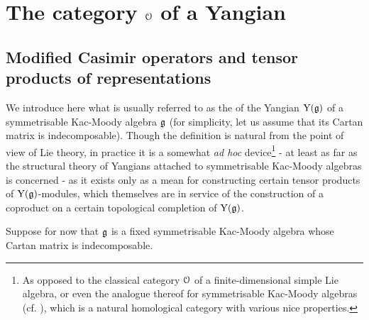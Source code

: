 \section{The category \texorpdfstring{$\mathcal{O}$}{} of a Yangian}
    \subsection{Modified Casimir operators and tensor products of representations}
        We introduce here what is usually referred to as the  of the Yangian $\mathrm{Y}(\mathfrak{g})$ of a symmetrisable Kac-Moody algebra $\mathfrak{g}$ (for simplicity, let us assume that its Cartan matrix is indecomposable). Though the definition is natural from the point of view of Lie theory, in practice it is a somewhat \textit{ad hoc} device\footnote{As opposed to the classical category $\mathcal{O}$ of a finite-dimensional simple Lie algebra, or even the analogue thereof for symmetrisable Kac-Moody algebras (cf. \cite[Chapter 9]{kac_infinite_dimensional_lie_algebras}), which is a natural homological category with various nice properties.} - at least as far as the structural theory of Yangians attached to symmetrisable Kac-Moody algebras is concerned - as it exists only as a mean for constructing certain tensor products of $\mathrm{Y}(\mathfrak{g})$-modules, which themselves are in service of the construction of a coproduct on a certain topological completion of $\mathrm{Y}(\mathfrak{g})$. 

        \begin{convention}
            Suppose for now that $\mathfrak{g}$ is a fixed symmetrisable Kac-Moody algebra whose Cartan matrix is indecomposable. 
        \end{convention}

